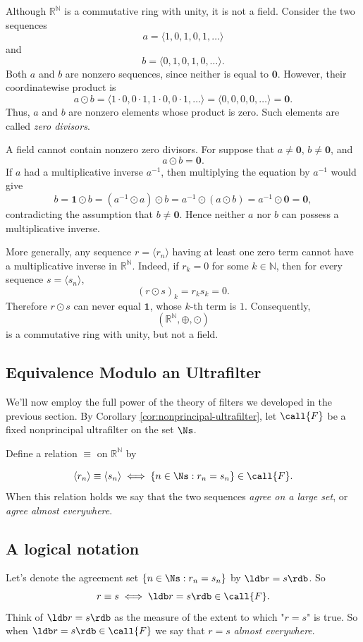Although \(\mathbb{R}^{\mathbb{N}}\) is a commutative ring with unity, it is
not a field. Consider the two sequences
\[
a=\langle 1,0,1,0,1,\ldots\rangle
\]
and
\[
b=\langle 0,1,0,1,0,\ldots\rangle.
\]
Both \(a\) and \(b\) are nonzero sequences, since neither is equal to
\(\mathbf{0}\). However, their coordinatewise product is
\[
a\odot b
=
\langle 1\cdot 0,0\cdot 1,1\cdot 0,0\cdot 1,\ldots\rangle
=
\langle 0,0,0,0,\ldots\rangle
=
\mathbf{0}.
\]
Thus, \(a\) and \(b\) are nonzero elements whose product is zero. Such
elements are called \emph{zero divisors}.

A field cannot contain nonzero zero divisors. For suppose that \(a\neq
\mathbf{0}\), \(b\neq\mathbf{0}\), and
\[
a\odot b=\mathbf{0}.
\]
If \(a\) had a multiplicative inverse \(a^{-1}\), then multiplying the
equation by \(a^{-1}\) would give
\[
b
=
\mathbf{1}\odot b
=
(a^{-1}\odot a)\odot b
=
a^{-1}\odot(a\odot b)
=
a^{-1}\odot\mathbf{0}
=
\mathbf{0},
\]
contradicting the assumption that \(b\neq\mathbf{0}\). Hence neither \(a\)
nor \(b\) can possess a multiplicative inverse.

More generally, any sequence \(r=\langle r_n\rangle\) having at least one
zero term cannot have a multiplicative inverse in
\(\mathbb{R}^{\mathbb{N}}\). Indeed, if \(r_k=0\) for some
\(k\in\mathbb{N}\), then for every sequence \(s=\langle s_n\rangle\),
\[
(r\odot s)_k=r_ks_k=0.
\]
Therefore \(r\odot s\) can never equal \(\mathbf{1}\), whose \(k\)-th term
is \(1\). Consequently,
\[
(\mathbb{R}^{\mathbb{N}},\oplus,\odot)
\]
is a commutative ring with unity, but not a field.

\subsection{Equivalence Modulo an Ultrafilter}
We'll now employ the full power of the theory of filters we developed in the previous section. By Corollary \ref{cor:nonprincipal-ultrafilter}, let $\call{F}$ be a fixed nonprincipal ultrafilter on the set $\Ns$.

Define a relation $\equiv$ on $\mathbb{R}^\mathbb{N}$ by

$$
\langle r_n \rangle \equiv \langle s_n \rangle \iff \{ n \in \Ns : r_n = s_n \} \in \call{F}.
$$
When this relation holds we say that the two sequences \textit{agree on a large set}, or \textit{agree almost everywhere}.

\subsection{A logical notation}
Let's denote the agreement set $\{ n \in \Ns : r_n = s_n \}$ by $\ldb r = s \rdb$. So
$$
r \equiv s \iff \ldb r=s \rdb \in \call{F}.
$$
Think of $\ldb r=s \rdb$ as the measure of the extent to which "$r=s$" is true. So when $\ldb r=s \rdb \in \call{F}$ we say that $r=s$ \textit{almost everywhere}. 

